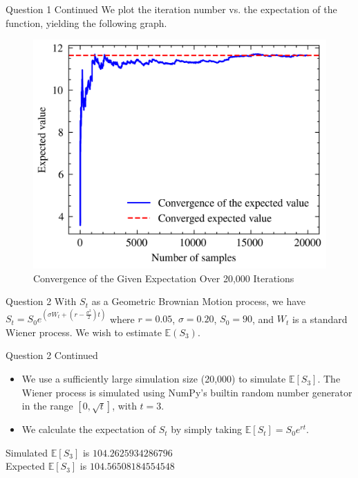 \documentclass[compress,12pt]{beamer}
\begin{document}
\begin{frame}{Question 1 Continued}
    We plot the iteration number vs. the expectation of the function, yielding the following graph.

    \begin{figure}
        \centering
        \includegraphics{imgs/convergence.png}
        \caption{Convergence of the Given Expectation Over 20,000 Iterations}
        \label{fig:convergence}
    \end{figure}
\end{frame}

\begin{frame}{Question 2}
    With $S_t$ as a Geometric Brownian Motion process, we have $S_t = S_0e^{(\sigma W_t + (r - \frac{\sigma^2}{2})t)}$ where $r = 0.05$, $\sigma = 0.20$, $S_0 = 90$, and $W_t$ is a standard Wiener process. We wish to estimate $\mathbb{E}(S_3)$.
\end{frame}

\begin{frame}{Question 2 Continued}

    \begin{itemize}
        \item We use a sufficiently large simulation size (20,000) to simulate $\mathbb{E}[S_3]$. The Wiener process is simulated using NumPy's
        builtin random number generator in the range $[0, \sqrt{t}]$, with $t = 3$.
        \item We calculate the expectation of $S_t$ by simply taking $\mathbb{E}[S_t] = S_0e^{rt}$.
    
    \end{itemize}

    \begin{tcolorbox}
        Simulated $\mathbb{E}[S_3]$ is $\boxed{104.2625934286796}$\\
        Expected $\mathbb{E}[S_3]$ is $\boxed{104.56508184554548}$
    \end{tcolorbox}
\end{frame}
\end{document}
